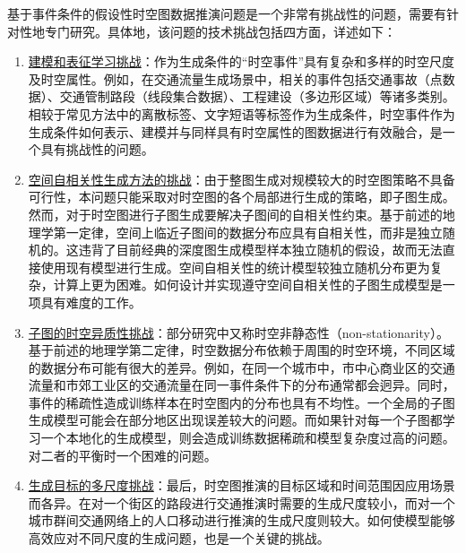 \documentclass[12pt,UTF8,AutoFakeBold=2,a4paper]{ctexart} %
\begin{document}
基于事件条件的假设性时空图数据推演问题是一个非常有挑战性的问题，需要有针对性地专门研究。具体地，该问题的技术挑战包括四方面，详述如下：
\begin{enumerate}
        \item \underline{建模和表征学习挑战}：作为生成条件的``时空事件''具有复杂和多样的时空尺度及时空属性。例如，在交通流量生成场景中，相关的事件包括交通事故（点数据）、交通管制路段（线段集合数据）、工程建设（多边形区域）等诸多类别。相较于常见方法中的离散标签、文字短语等标签作为生成条件，时空事件作为生成条件如何表示、建模并与同样具有时空属性的图数据进行有效融合，是一个具有挑战性的问题。
        \item \underline{空间自相关性生成方法的挑战}：由于整图生成对规模较大的时空图策略不具备可行性，本问题只能采取对时空图的各个局部进行生成的策略，即子图生成。然而，对于时空图进行子图生成要解决子图间的自相关性约束。基于前述的地理学第一定律，空间上临近子图间的数据分布应具有自相关性，而非是独立随机的。这违背了目前经典的深度图生成模型样本独立随机的假设，故而无法直接使用现有模型进行生成。空间自相关性的统计模型较独立随机分布更为复杂，计算上更为困难。如何设计并实现遵守空间自相关性的子图生成模型是一项具有难度的工作。
        \item \underline{子图的时空异质性挑战}：部分研究中又称时空非静态性（non-stationarity）。基于前述的地理学第二定律，时空数据分布依赖于周围的时空环境，不同区域的数据分布可能有很大的差异。例如，在同一个城市中，市中心商业区的交通流量和市郊工业区的交通流量在同一事件条件下的分布通常都会迥异。同时，事件的稀疏性造成训练样本在时空图内的分布也具有不均性。一个全局的子图生成模型可能会在部分地区出现误差较大的问题。而如果针对每一个子图都学习一个本地化的生成模型，则会造成训练数据稀疏和模型复杂度过高的问题。对二者的平衡时一个困难的问题。
        \item \underline{生成目标的多尺度挑战}：最后，时空图推演的目标区域和时间范围因应用场景而各异。在对一个街区的路段进行交通推演时需要的生成尺度较小，而对一个城市群间交通网络上的人口移动进行推演的生成尺度则较大。如何使模型能够高效应对不同尺度的生成问题，也是一个关键的挑战。
\end{enumerate}
\end{document}
